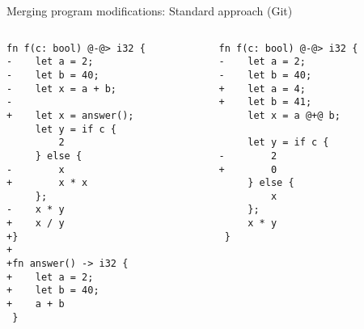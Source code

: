 \documentclass{beamer}
\begin{document}
\begin{frame}[fragile]{Merging program modifications: Standard approach (Git)}
\vspace{-0.5em}
\begin{columns}
\begin{column}{0.5\textwidth}
\vspace{0.5em}
\begin{lstlisting}[style=diff,rulecolor=\color{blue!20}]
 fn f(c: bool) @-@> i32 {
-    let a = 2;
-    let b = 40;
-    let x = a + b;
-
+    let x = answer();
     let y = if c {
         2
     } else {
-        x
+        x * x
     };
-    x * y
+    x / y
+}
+
+fn answer() -> i32 {
+    let a = 2;
+    let b = 40;
+    a + b
 }
\end{lstlisting}
\end{column}
\begin{column}{0.5\textwidth}
\vspace{0.5em}
\begin{lstlisting}[style=diff,rulecolor=\color{orange!30}]
 fn f(c: bool) @-@> i32 {
-    let a = 2;
-    let b = 40;
+    let a = 4;
+    let b = 41;
     let x = a @+@ b;
 
     let y = if c {
-        2
+        0
     } else {
         x
     };
     x * y
 }
\end{lstlisting}
\end{column}
\end{columns}
\end{frame}
\end{document}
